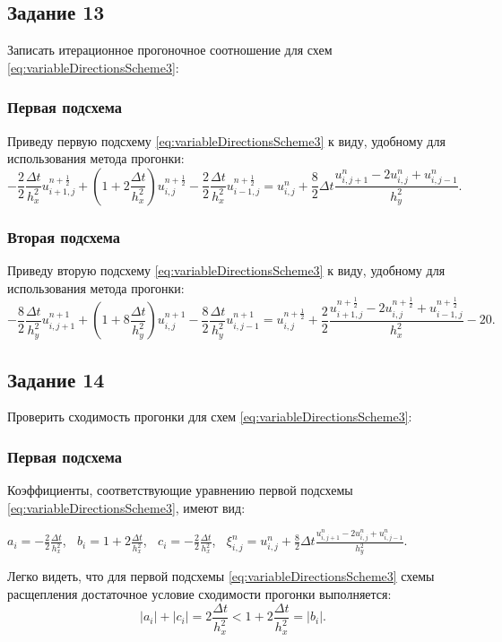 \documentclass[12pt, a4paper]{report}
\begin{document}
	\subsection*{Задание 13}
	\large
	Записать итерационное прогоночное соотношение для схем \eqref{eq:variableDirectionsScheme3}:
	\subsubsection*{Первая подсхема}
	\large
	Приведу первую подсхему \eqref{eq:variableDirectionsScheme3} к виду, удобному для использования метода прогонки:
	\small
	\begin{equation*}
		-\frac{2}{2}\frac{\Delta t}{h_{x}^{2}}u_{i+1, j}^{n+\frac{1}{2}} + (1 + 2\frac{\Delta t}{h_{x}^{2}})u_{i, j}^{n+\frac{1}{2}} - \frac{2}{2}\frac{\Delta t}{h_{x}^{2}}u_{i-1, j}^{n+\frac{1}{2}} = u_{i, j}^{n} + \frac{8}{2}\Delta t\frac{u_{i, j+1}^{n} - 2u_{i, j}^{n} + u_{i, j-1}^{n}}{h_{y}^{2}}.
	\end{equation*}
	\subsubsection*{Вторая подсхема}
	\large
	Приведу вторую подсхему \eqref{eq:variableDirectionsScheme3} к виду, удобному для использования метода прогонки:
	\small
	\begin{equation*}
		-\frac{8}{2}\frac{\Delta t}{h_{y}^{2}}u_{i, j+1}^{n+1} + (1 + 8\frac{\Delta t}{h_{y}^{2}})u_{i, j}^{n+1} - \frac{8}{2}\frac{\Delta t}{h_{y}^{2}}u_{i, j-1}^{n+1} = u_{i, j}^{n+\frac{1}{2}} + \frac{2}{2}\frac{u_{i+1, j}^{n+\frac{1}{2}} - 2u_{i, j}^{n+\frac{1}{2}} + u_{i-1, j}^{n+\frac{1}{2}}}{h_{x}^{2}} - 20.
	\end{equation*}

	\subsection*{Задание 14}
	\large
	Проверить сходимость прогонки для схем \eqref{eq:variableDirectionsScheme3}:
	\subsubsection*{Первая подсхема}
	\large
	Коэффициенты, соответствующие уравнению первой подсхемы \eqref{eq:variableDirectionsScheme3}, имеют вид:
	\small
	\begin{center}
		$a_{i}=-\frac{2}{2}\frac{\Delta t}{h_{x}^{2}}$, $\>$ $b_{i}=1 + 2\frac{\Delta t}{h_{x}^{2}}$, $\>$ $c_{i}=-\frac{2}{2}\frac{\Delta t}{h_{x}^{2}}$, $\>$ $\xi_{i, j}^{n}=u_{i, j}^{n} + \frac{8}{2}\Delta t\frac{u_{i, j+1}^{n} - 2u_{i, j}^{n} + u_{i, j-1}^{n}}{h_{y}^{2}}$.
	\end{center}
	\par
	\large
	Легко видеть, что для первой подсхемы \eqref{eq:variableDirectionsScheme3} схемы расщепления достаточное условие сходимости прогонки выполняется:
	\begin{equation*}
		\lvert a_{i} \rvert + \lvert c_{i} \rvert = 2\frac{\Delta t}{h_{x}^{2}} < 1 + 2\frac{\Delta t}{h_{x}^{2}} = \lvert b_{i} \rvert.
	\end{equation*}
\end{document}

